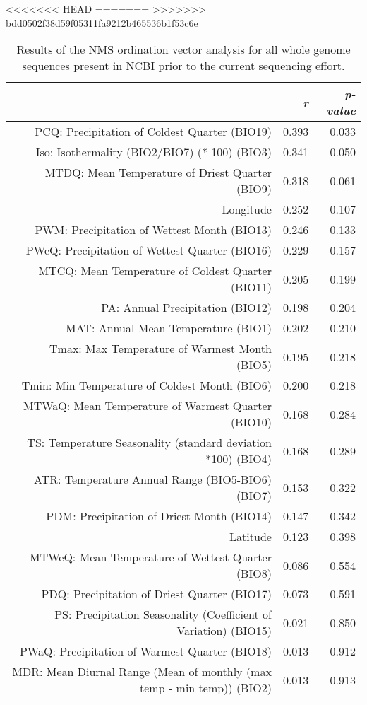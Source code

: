 <<<<<<< HEAD
=======
>>>>>>> bdd0502f38d59f05311fa9212b465536b1f53c6e
\begin{table}[ht]
\centering
\begin{tabular}{rrr}
  \hline
 & {\emph{r}} & {\emph{p-value}} \\ 
  \hline
PCQ: Precipitation of Coldest Quarter (BIO19) & 0.393 & 0.033 \\ 
  Iso: Isothermality (BIO2/BIO7) (* 100) (BIO3) & 0.341 & 0.050 \\ 
  MTDQ: Mean Temperature of Driest Quarter (BIO9) & 0.318 & 0.061 \\ 
  Longitude & 0.252 & 0.107 \\ 
  PWM: Precipitation of Wettest Month (BIO13) & 0.246 & 0.133 \\ 
  PWeQ: Precipitation of Wettest Quarter (BIO16) & 0.229 & 0.157 \\ 
  MTCQ: Mean Temperature of Coldest Quarter (BIO11) & 0.205 & 0.199 \\ 
  PA: Annual Precipitation (BIO12) & 0.198 & 0.204 \\ 
  MAT: Annual Mean Temperature (BIO1) & 0.202 & 0.210 \\ 
  Tmax: Max Temperature of Warmest Month (BIO5) & 0.195 & 0.218 \\ 
  Tmin: Min Temperature of Coldest Month (BIO6) & 0.200 & 0.218 \\ 
  MTWaQ: Mean Temperature of Warmest Quarter (BIO10) & 0.168 & 0.284 \\ 
  TS: Temperature Seasonality (standard deviation *100) (BIO4) & 0.168 & 0.289 \\ 
  ATR: Temperature Annual Range (BIO5-BIO6) (BIO7) & 0.153 & 0.322 \\ 
  PDM: Precipitation of Driest Month (BIO14) & 0.147 & 0.342 \\ 
  Latitude & 0.123 & 0.398 \\ 
  MTWeQ: Mean Temperature of Wettest Quarter (BIO8) & 0.086 & 0.554 \\ 
  PDQ: Precipitation of Driest Quarter (BIO17) & 0.073 & 0.591 \\ 
  PS: Precipitation Seasonality (Coefficient of Variation) (BIO15) & 0.021 & 0.850 \\ 
  PWaQ: Precipitation of Warmest Quarter (BIO18) & 0.013 & 0.912 \\ 
  MDR: Mean Diurnal Range (Mean of monthly (max temp - min temp)) (BIO2) & 0.013 & 0.913 \\ 
   \hline
\end{tabular}
\caption{Results of the NMS ordination vector analysis for all whole genome sequences present in NCBI prior to the current sequencing effort.} 
\label{tab:wc_napg_vec}
\end{table}
